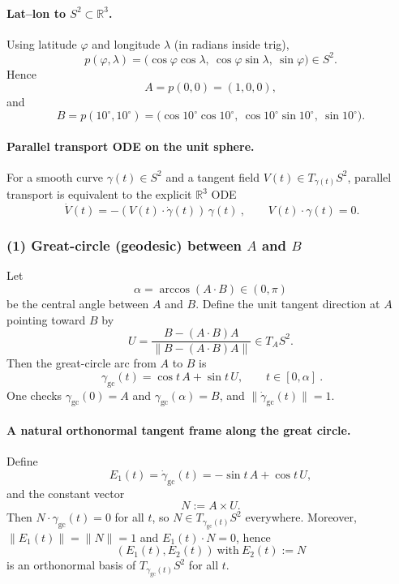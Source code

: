 \documentclass[12pt,a4paper]{article}
\theoremstyle{plain}
\theoremstyle{definition}      %
\begin{document}
\paragraph{Lat--lon to $S^2\subset\mathbb{R}^3$.}
Using latitude $\varphi$ and longitude $\lambda$ (in radians inside trig),
\[
p(\varphi,\lambda)=\big(\cos\varphi\cos\lambda,\ \cos\varphi\sin\lambda,\ \sin\varphi\big)\in S^2.
\]
Hence
\[
A=p(0,0)=(1,0,0),
\]
and
\[
B=p(10^\circ,10^\circ)
=\big(\cos 10^\circ\cos 10^\circ,\ \cos 10^\circ\sin 10^\circ,\ \sin 10^\circ\big).
\]

\paragraph{Parallel transport ODE on the unit sphere.}
For a smooth curve $\gamma(t)\in S^2$ and a tangent field $V(t)\in T_{\gamma(t)}S^2$,
parallel transport is equivalent to the explicit $\mathbb{R}^3$ ODE
\[
\boxed{\ \dot V(t)=-(V(t)\cdot \dot\gamma(t))\,\gamma(t)\ },\qquad V(t)\cdot \gamma(t)=0.
\]

\subsubsection*{(1) Great-circle (geodesic) between $A$ and $B$}

Let
\[
\alpha=\arccos(A\cdot B)\in(0,\pi)
\]
be the central angle between $A$ and $B$.
Define the unit tangent direction at $A$ pointing toward $B$ by
\[
U=\frac{B-(A\cdot B)A}{\|B-(A\cdot B)A\|}\in T_A S^2.
\]
Then the great-circle arc from $A$ to $B$ is
\[
\boxed{\ \gamma_{\mathrm{gc}}(t)=\cos t\,A+\sin t\,U,\qquad t\in[0,\alpha]\ }.
\]
One checks $\gamma_{\mathrm{gc}}(0)=A$ and $\gamma_{\mathrm{gc}}(\alpha)=B$, and $\|\dot\gamma_{\mathrm{gc}}(t)\|=1$.

\paragraph{A natural orthonormal tangent frame along the great circle.}
Define
\[
E_1(t)=\dot\gamma_{\mathrm{gc}}(t)=-\sin t\,A+\cos t\,U,
\]
and the constant vector
\[
N:=A\times U.
\]
Then $N\cdot \gamma_{\mathrm{gc}}(t)=0$ for all $t$, so $N\in T_{\gamma_{\mathrm{gc}}(t)}S^2$ everywhere.
Moreover, $\|E_1(t)\|=\|N\|=1$ and $E_1(t)\cdot N=0$, hence
\[
(E_1(t),E_2(t))\ \text{with}\ E_2(t):=N
\]
is an orthonormal basis of $T_{\gamma_{\mathrm{gc}}(t)}S^2$ for all $t$.
\end{document}
